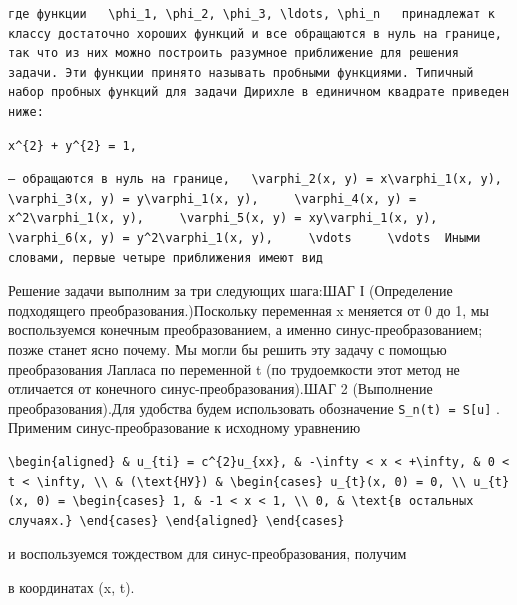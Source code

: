 \documentclass[
  ukrainian,
]{article}
\begin{document}
\begin{verbatim}
где функции   \phi_1, \phi_2, \phi_3, \ldots, \phi_n   принадлежат к классу достаточно хороших функций и все обращаются в нуль на границе, так что из них можно построить разумное приближение для решения задачи. Эти функции принято называть пробными функциями. Типичный набор пробных функций для задачи Дирихле в единичном квадрате приведен ниже:
\end{verbatim}

\begin{verbatim}
x^{2} + y^{2} = 1,
\end{verbatim}

\begin{verbatim}
— обращаются в нуль на границе,   \varphi_2(x, y) = x\varphi_1(x, y),     \varphi_3(x, y) = y\varphi_1(x, y),     \varphi_4(x, y) = x^2\varphi_1(x, y),     \varphi_5(x, y) = xy\varphi_1(x, y),     \varphi_6(x, y) = y^2\varphi_1(x, y),     \vdots     \vdots  Иными словами, первые четыре приближения имеют вид
\end{verbatim}

Решение задачи выполним за три следующих шага:ШАГ І (Определение
подходящего преобразования.)Поскольку переменная x меняется от 0 до 1,
мы воспользуемся конечным преобразованием, а именно
синус-преобразованием; позже станет ясно почему. Мы могли бы решить эту
задачу с помощью преобразования Лапласа по переменной t (по трудоемкости
этот метод не отличается от конечного синус-преобразования).ШАГ 2
(Выполнение преобразования).Для удобства будем использовать обозначение
\texttt{S\_n(t)\ =\ S{[}u{]}} . Применим синус-преобразование к
исходному уравнению

\begin{verbatim}
\begin{aligned} & u_{ti} = c^{2}u_{xx}, & -\infty < x < +\infty, & 0 < t < \infty, \\ & (\text{НУ}) & \begin{cases} u_{t}(x, 0) = 0, \\ u_{t}(x, 0) = \begin{cases} 1, & -1 < x < 1, \\ 0, & \text{в остальных случаях.} \end{cases} \end{aligned} \end{cases}
\end{verbatim}

и воспользуемся тождеством для синус-преобразования, получим

в координатах (x, t).
\end{document}
